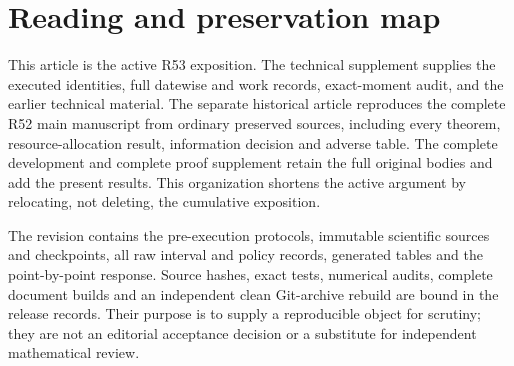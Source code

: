 \documentclass[ecta,nameyear,draft]{econsocart}
\begin{document}
\appendix
\section{Reading and preservation map}\label{app:map53}
This article is the active R53 exposition. The technical supplement supplies the executed identities, full datewise and work records, exact-moment audit, and the earlier technical material. The separate historical article reproduces the complete R52 main manuscript from ordinary preserved sources, including every theorem, resource-allocation result, information decision and adverse table. The complete development and complete proof supplement retain the full original bodies and add the present results. This organization shortens the active argument by relocating, not deleting, the cumulative exposition.

The revision contains the pre-execution protocols, immutable scientific sources and checkpoints, all raw interval and policy records, generated tables and the point-by-point response. Source hashes, exact tests, numerical audits, complete document builds and an independent clean Git-archive rebuild are bound in the release records. Their purpose is to supply a reproducible object for scrutiny; they are not an editorial acceptance decision or a substitute for independent mathematical review.


\end{document}
